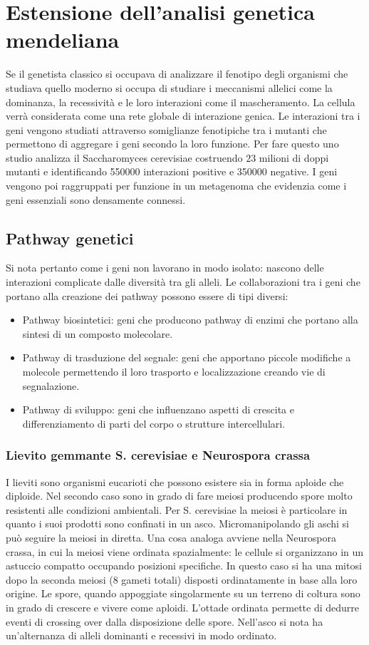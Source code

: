 \chapter{Estensione dell'analisi genetica mendeliana}
Se il genetista classico si occupava di analizzare il fenotipo degli organismi che studiava quello moderno si occupa di studiare i meccanismi allelici come la dominanza, la 
recessivit\`a e le loro interazioni come il mascheramento. La cellula verr\`a considerata come una rete globale di interazione genica. Le interazioni tra i geni vengono studiati 
attraverso somiglianze fenotipiche tra i mutanti che permettono di aggregare i geni secondo la loro funzione. Per fare questo uno studio analizza il Saccharomyces cerevisiae costruendo
$23$ milioni di doppi mutanti e identificando \num{550000} interazioni positive e \num{350000} negative. I geni vengono poi raggruppati per funzione in un metagenoma che
evidenzia come i geni essenziali sono densamente connessi. 
\section{Pathway genetici}
Si nota pertanto come i geni non lavorano in modo isolato: nascono delle interazioni complicate dalle diversit\`a tra gli alleli. Le collaborazioni tra i geni che portano alla
creazione dei pathway possono essere di tipi diversi:
\begin{itemize}
	\item Pathway biosintetici: geni che producono pathway di enzimi che portano alla sintesi di un composto molecolare.
	\item Pathway di trasduzione del segnale: geni che apportano piccole modifiche a molecole permettendo il loro trasporto e localizzazione creando vie di segnalazione.
	\item Pathway di sviluppo: geni che influenzano aspetti di crescita e differenziamento di parti del corpo o strutture intercellulari.
\end{itemize}
\subsection{Lievito gemmante S. cerevisiae e Neurospora crassa}
I lieviti sono organismi eucarioti che possono esistere sia in forma aploide che diploide. Nel secondo caso sono in grado di fare meiosi producendo spore molto resistenti alle condizioni ambientali.
Per S. cerevisiae la meiosi \`e particolare in quanto i suoi prodotti sono confinati in un asco. Micromanipolando gli aschi si pu\`o seguire la meiosi in diretta. Una cosa analoga avviene nella 
Neurospora crassa, in cui la meiosi viene ordinata spazialmente: le cellule si organizzano in un astuccio compatto occupando posizioni specifiche. In questo caso si ha una mitosi dopo la seconda 
meiosi ($8$ gameti totali) disposti ordinatamente in base alla loro origine. Le spore, quando appoggiate singolarmente su un terreno di coltura sono in grado di crescere e vivere come aploidi. L'ottade
ordinata permette di dedurre eventi di crossing over dalla disposizione delle spore. Nell'asco si nota ha un'alternanza di alleli dominanti e recessivi in modo ordinato. 
